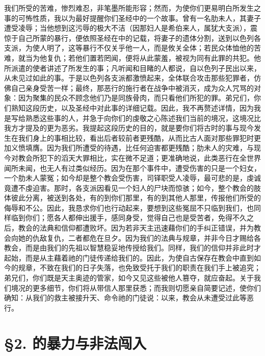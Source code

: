 我们所受的苦难，惨烈难忍，非笔墨所能形容；然而，为使你们更易明白所发生之事的可怖性质，我以为最好提醒你们圣经中的一个故事。曾有一名肋未人，其妻子遭受凌辱；当他想到这污辱的极大不洁（因那妇人是希伯来人，属犹大支派），震惊于自己所蒙的暴行，便依照圣经在中的记载，将妻子的遗体分割，送到以色列各支派，为使人明了，这等暴行不仅关乎他一人，而是攸关全体；若民众体恤他的苦难，就当为他复仇；若他们置若罔闻，便将从此蒙羞，被视为同有此罪的共犯。他所派遣的使者讲述了所发生的事；凡听闻和目睹的人都说，自以色列子民出以来，从未见过如此的事。于是以色列各支派都激愤起来，全体联合攻击那些犯罪者，仿佛自己亲身受苦一样；最终，那恶行的施行者在战争中被消灭，成为众人咒骂的对象：因为聚集的民众不顾念他们乃是同族骨肉，而只看他们所犯的罪。弟兄们，你们熟知这段历史，以及圣经中对此事的详细记载。因此，我不再赘述详情，因为我是写给熟悉这些事的人，并急于向你们的虔敬之心陈述我们当前的境况，这境况比我方才提及的更为恶劣。我提起这段历史的目的，就是要你们将古时的事与现今发生在我们身上的事相比较，看出后者较前者更残酷，从而比古人面对那些罪犯时更加义愤填膺。因为我们所遭受的待遇，比任何迫害都更残酷；肋未人的灾难，与现今对教会所犯下的滔天大罪相比，实在微不足道；更准确地说，此类恶行在全世界闻所未闻，也无人有过类似经历。因为在那个事件中，遭受伤害的只是一个妇女，一个肋未人蒙冤；如今却是整个教会受伤害，司铎职受人凌辱，最可悲的是，虔诚竟遭不虔迫害。那时，各支派因看见一个妇人的尸块而惊骇；如今，整个教会的肢体彼此分离，被送到各处，有的到你们那里，有的到其他人那里，传报他们所受的侮辱和不公。因此，我恳求你们也行动起来，要想到这些冤屈不只临到我们，也同样临到你们；愿各人都伸出援手，感同身受，觉得自己也是受苦者，免得不久之后，教会的法典和信仰都遭败坏。因为若非天主迅速藉你们的手纠正错误，并为教会向她的仇敌复仇，二者都危在旦夕。因为我们的法典与规章，并非今日才赐给各教会，而是由我们的先祖以智慧稳妥地传授给我们。同样，我们的信仰并非此时才起始，而是从主藉着祂的门徒传递给我们的。因此，为使自古保存在教会中直到如今的规章，不致在我们的日子失落，也免致受托于我们的职责在我们手上被追究；弟兄们，你们既是天主奥迹的管家，如今又见这些被他人篡夺，就应奋起。关于我们境况的更多细节，你们将从带信人那里获悉；而我则切愿亲自简要记述，使你们确知：从我们的救主被接升天、命令祂的门徒说：以来，教会从未遭受过此等恶行。\par


\section{§2. 的暴力与非法闯入}

